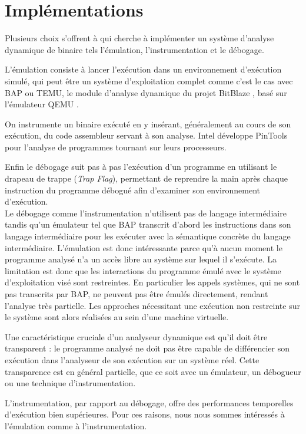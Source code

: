 \section{Implémentations}
Plusieurs choix s'offrent à qui cherche à implémenter un système d'analyse dynamique de binaire tels l'émulation, l'instrumentation et le débogage.

L'émulation consiste à lancer l'exécution dans un environnement d'exécution simulé, qui peut être un système d'exploitation complet comme c'est le cas avec BAP ou TEMU, le module d'analyse dynamique du projet BitBlaze \cite{bitblaze08}, basé sur l'émulateur QEMU \cite{QEMU05}.

On instrumente un binaire exécuté en y insérant, généralement au cours de son exécution, du code assembleur servant à son analyse. Intel développe PinTools \cite{pintools} pour l'analyse de programmes tournant sur leurs processeurs.

Enfin le débogage suit pas à pas l'exécution d'un programme en utilisant le drapeau de trappe (\emph{Trap Flag}), permettant de reprendre la main après chaque instruction du programme débogué afin d'examiner son environnement d'exécution.
\\

Le débogage comme l'instrumentation n'utilisent pas de langage intermédiaire tandis qu'un émulateur tel que BAP transcrit d'abord les instructions dans son langage intermédiaire pour les exécuter avec la sémantique concrète du langage intermédiaire.
L'émulation est donc intéressante parce qu'à aucun moment le programme analysé n'a un accès libre au système sur lequel il s'exécute.
La limitation est donc que les interactions du programme émulé avec le système d'exploitation visé sont restreintes.
En particulier les appels systèmes, qui ne sont pas transcrits par BAP, ne peuvent pas être émulés directement, rendant l'analyse très partielle.
Les approches nécessitant une exécution non restreinte sur le système sont alors réalisées au sein d'une machine virtuelle.

Une caractéristique cruciale d'un analyseur dynamique est qu'il doit être transparent : le programme analysé ne doit pas être capable de différencier son exécution dans l'analyseur de son exécution sur un système réel.
Cette transparence est en général partielle, que ce soit avec un émulateur, un débogueur ou une technique d'instrumentation. 

L'instrumentation, par rapport au débogage, offre des performances temporelles d'exécution bien supérieures.
Pour ces raisons, nous nous sommes intéressés à l'émulation comme à l'instrumentation.
\\

